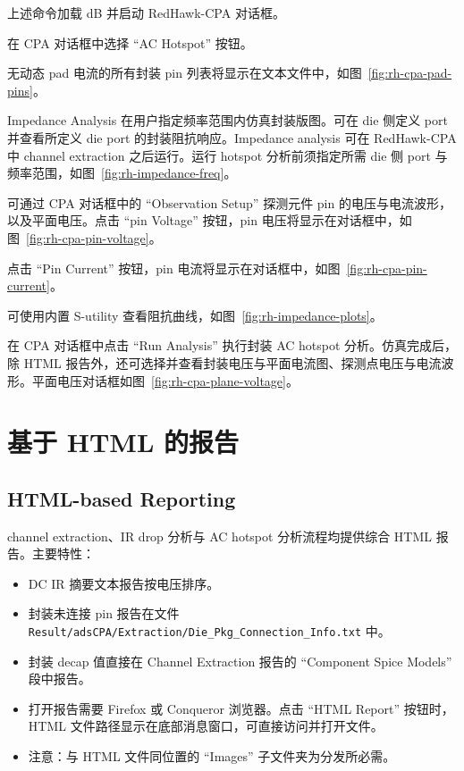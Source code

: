 上述命令加载 dB 并启动 RedHawk-CPA 对话框。

在 CPA 对话框中选择 ``AC Hotspot'' 按钮。

无动态 pad 电流的所有封装 pin 列表将显示在文本文件中，如图~\ref{fig:rh-cpa-pad-pins}。

\label{fig:rh-cpa-pad-pins}

Impedance Analysis 在用户指定频率范围内仿真封装版图。可在 die 侧定义 port 并查看所定义 die port 的封装阻抗响应。Impedance analysis 可在 RedHawk-CPA 中 channel extraction 之后运行。运行 hotspot 分析前须指定所需 die 侧 port 与频率范围，如图~\ref{fig:rh-impedance-freq}。

\label{fig:rh-impedance-freq}

可通过 CPA 对话框中的 ``Observation Setup'' 探测元件 pin 的电压与电流波形，以及平面电压。点击 ``pin Voltage'' 按钮，pin 电压将显示在对话框中，如图~\ref{fig:rh-cpa-pin-voltage}。

\label{fig:rh-cpa-pin-voltage}

点击 ``Pin Current'' 按钮，pin 电流将显示在对话框中，如图~\ref{fig:rh-cpa-pin-current}。

\label{fig:rh-cpa-pin-current}

可使用内置 S-utility 查看阻抗曲线，如图~\ref{fig:rh-impedance-plots}。

\label{fig:rh-impedance-plots}

在 CPA 对话框中点击 ``Run Analysis'' 执行封装 AC hotspot 分析。仿真完成后，除 HTML 报告外，还可选择并查看封装电压与平面电流图、探测点电压与电流波形。平面电压对话框如图~\ref{fig:rh-cpa-plane-voltage}。

\label{fig:rh-cpa-plane-voltage}

\section{基于 HTML 的报告}
\subsection*{HTML-based Reporting}

channel extraction、IR drop 分析与 AC hotspot 分析流程均提供综合 HTML 报告。主要特性：
\begin{itemize}
  \item DC IR 摘要文本报告按电压排序。
  \item 封装未连接 pin 报告在文件 \texttt{Result/adsCPA/Extraction/Die\_Pkg\_Connection\_Info.txt} 中。
  \item 封装 decap 值直接在 Channel Extraction 报告的 ``Component Spice Models'' 段中报告。
  \item 打开报告需要 Firefox 或 Conqueror 浏览器。点击 ``HTML Report'' 按钮时，HTML 文件路径显示在底部消息窗口，可直接访问并打开文件。
  \item 注意：与 HTML 文件同位置的 ``Images'' 子文件夹为分发所必需。
\end{itemize}

